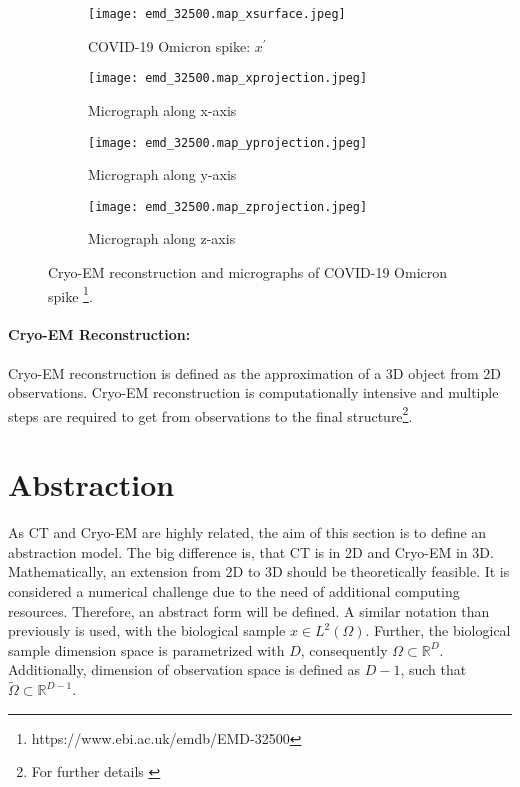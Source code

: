 \begin{figure}[H]
    \captionsetup[subfigure]{justification=centering}
    \centering
    \begin{subfigure}[t]{0.2\textwidth}
        \texttt{[image: emd\_32500.map\_xsurface.jpeg]}
        \caption{COVID-19 Omicron spike: $x^{\prime}$}
    \end{subfigure} \hfill
    \begin{subfigure}[t]{0.2\textwidth}
      \texttt{[image: emd\_32500.map\_xprojection.jpeg]}
      \caption{Micrograph along x-axis}
    \end{subfigure}\hfill
    \begin{subfigure}[t]{0.2\textwidth}
      \texttt{[image: emd\_32500.map\_yprojection.jpeg]}
      \caption{Micrograph along y-axis}
    \end{subfigure}\hfill
    \begin{subfigure}[t]{0.2\textwidth}
        \texttt{[image: emd\_32500.map\_zprojection.jpeg]}
        \caption{Micrograph along z-axis}
      \end{subfigure}
    \caption{Cryo-EM reconstruction and micrographs of COVID-19 Omicron spike \protect\footnote{https://www.ebi.ac.uk/emdb/EMD-32500}.}
    \label{fig:cryo-em-omicron}
  \end{figure}


\paragraph{Cryo-EM Reconstruction:}
Cryo-EM reconstruction is defined as the approximation of a 3D object from 2D observations.
Cryo-EM reconstruction is computationally intensive and multiple steps are required to get from 
observations to the final structure\footnote{For further details \cite{singleParticleCryoEm, cryoEmMath}}.


\section{Abstraction}
As CT and Cryo-EM are highly related, the aim of this section is to define
an abstraction model. The big difference is, that CT is in 2D and Cryo-EM in 3D.
Mathematically, an extension from 2D to 3D should be theoretically feasible. 
It is considered a numerical challenge due to the need of additional computing resources.
Therefore, an abstract form will be defined.
A similar notation than previously is used, with the biological sample $x \in L^2(\Omega)$.
Further, the biological sample dimension space is parametrized with $D$, consequently $\Omega \subset \mathbb{R}^D$.
Additionally, dimension of observation space is defined as $D-1$, such that 
$\tilde{\Omega} \subset \mathbb{R}^{D-1}$.



